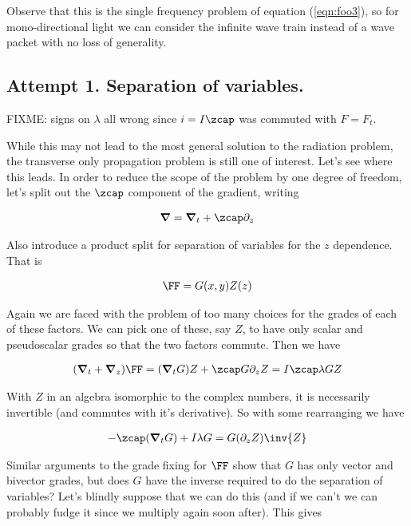 Observe that this is the single frequency problem of equation (\ref{eqn:foo3}), so for mono-directional light we can consider the infinite wave train instead of a wave packet with no loss of generality.

\subsection{Attempt 1.  Separation of variables.}

FIXME: signs on $\lambda$ all wrong since $i = I\zcap$ was commuted with $F = F_t$.

While this may not lead to the most general solution to the radiation problem, the transverse only propagation problem is still one of interest.  Let's see where this leads.  In order to reduce the scope of the problem by one degree of freedom, let's split out the $\zcap$ component of the gradient, writing

\begin{align}\label{eqn:foo9}
\spacegrad = \spacegrad_t + \zcap \partial_z
\end{align}

Also introduce a product split for separation of variables for the $z$ dependence.  That is

\begin{align}\label{eqn:foo10}
\FF = G(x,y) Z(z)
\end{align}

Again we are faced with the problem of too many choices for the grades of each of these factors.  We can pick one of these, say $Z$, to have only scalar and pseudoscalar grades so that the two factors commute.  Then we have

\begin{align*}
(\spacegrad_t + \spacegrad_z) \FF = (\spacegrad_t G) Z + \zcap G \partial_z Z = I \zcap \lambda G Z
\end{align*}

With $Z$ in an algebra isomorphic to the complex numbers, it is necessarily invertible (and commutes with it's derivative).  So with some rearranging we have

\begin{align*}
-\zcap (\spacegrad_t G) + I \lambda G = G (\partial_z Z)\inv{Z} 
\end{align*}

Similar arguments to the grade fixing for $\FF$ show that $G$ has only vector and bivector grades, but does $G$ have the inverse required to do the separation of variables?  Let's blindly suppose that we can do this (and if we can't we can probably fudge it since we multiply again soon after).  This gives

